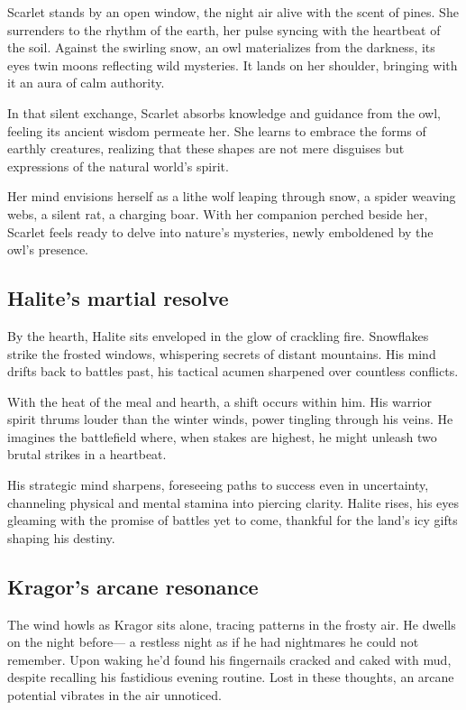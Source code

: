 \documentclass[
  letterpaper,12pt,twoside,twocolumn,openany,
  nodeprecatedcode,bg=full]{dndbook}
\begin{document}
Scarlet stands by an open window, the night air alive with the scent of
pines. She surrenders to the rhythm of the earth, her pulse syncing with
the heartbeat of the soil. Against the swirling snow, an owl
materializes from the darkness, its eyes twin moons reflecting wild
mysteries. It lands on her shoulder, bringing with it an aura of calm
authority.

In that silent exchange, Scarlet absorbs knowledge and guidance from the
owl, feeling its ancient wisdom permeate her. She learns to embrace the
forms of earthly creatures, realizing that these shapes are not mere
disguises but expressions of the natural world's spirit.

Her mind envisions herself as a lithe wolf leaping through snow, a
spider weaving webs, a silent rat, a charging boar. With her companion
perched beside her, Scarlet feels ready to delve into nature's
mysteries, newly emboldened by the owl's presence.

\subsection{Halite's martial resolve}\label{halites-martial-resolve}

By the hearth, Halite sits enveloped in the glow of crackling fire.
Snowflakes strike the frosted windows, whispering secrets of distant
mountains. His mind drifts back to battles past, his tactical acumen
sharpened over countless conflicts.

With the heat of the meal and hearth, a shift occurs within him. His
warrior spirit thrums louder than the winter winds, power tingling
through his veins. He imagines the battlefield where, when stakes are
highest, he might unleash two brutal strikes in a heartbeat.

His strategic mind sharpens, foreseeing paths to success even in
uncertainty, channeling physical and mental stamina into piercing
clarity. Halite rises, his eyes gleaming with the promise of battles yet
to come, thankful for the land's icy gifts shaping his destiny.

\subsection{Kragor's arcane resonance}\label{kragors-arcane-resonance}

The wind howls as Kragor sits alone, tracing patterns in the frosty air.
He dwells on the night before--- a restless night as if he had
nightmares he could not remember. Upon waking he'd found his fingernails
cracked and caked with mud, despite recalling his fastidious evening
routine. Lost in these thoughts, an arcane potential vibrates in the air
unnoticed.
\end{document}
